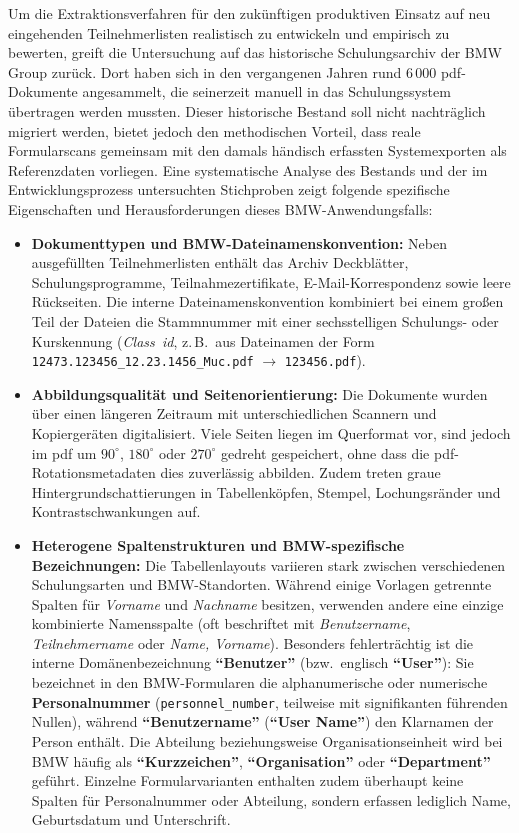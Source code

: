 Um die Extraktionsverfahren für den zukünftigen produktiven Einsatz auf neu eingehenden Teilnehmerlisten realistisch zu entwickeln und empirisch zu bewerten, greift die Untersuchung auf das historische Schulungsarchiv der BMW Group zurück. Dort haben sich in den vergangenen Jahren rund 6\,000 \ac{pdf}-Dokumente angesammelt, die seinerzeit manuell in das Schulungssystem übertragen werden mussten. Dieser historische Bestand soll nicht nachträglich migriert werden, bietet jedoch den methodischen Vorteil, dass reale Formularscans gemeinsam mit den damals händisch erfassten Systemexporten als Referenzdaten vorliegen. Eine systematische Analyse des Bestands und der im Entwicklungsprozess untersuchten Stichproben zeigt folgende spezifische Eigenschaften und Herausforderungen dieses BMW-Anwendungsfalls:
\begin{itemize}
  \item \textbf{Dokumenttypen und BMW-Dateinamenskonvention:} Neben ausgefüllten Teilnehmerlisten enthält das Archiv Deckblätter, Schulungsprogramme, Teilnahmezertifikate, E-Mail-Korrespondenz sowie leere Rückseiten. Die interne Dateinamenskonvention kombiniert bei einem großen Teil der Dateien die Stammnummer mit einer sechsstelligen Schulungs- oder Kurskennung (\emph{Class~\ac{id}}, z.\,B.\ aus Dateinamen der Form \texttt{12473.123456\_12.23.1456\_Muc.pdf} $\rightarrow$ \texttt{123456.pdf}).
  \item \textbf{Abbildungsqualität und Seitenorientierung:} Die Dokumente wurden über einen längeren Zeitraum mit unterschiedlichen Scannern und Kopiergeräten digitalisiert. Viele Seiten liegen im Querformat vor, sind jedoch im \ac{pdf} um $90^\circ$, $180^\circ$ oder $270^\circ$ gedreht gespeichert, ohne dass die \ac{pdf}-Rotationsmetadaten dies zuverlässig abbilden. Zudem treten graue Hintergrundschattierungen in Tabellenköpfen, Stempel, Lochungsränder und Kontrastschwankungen auf.
  \item \textbf{Heterogene Spaltenstrukturen und BMW-spezifische Bezeichnungen:} Die Tabellenlayouts variieren stark zwischen verschiedenen Schulungsarten und BMW-Standorten. Während einige Vorlagen getrennte Spalten für \emph{Vorname} und \emph{Nachname} besitzen, verwenden andere eine einzige kombinierte Namensspalte (oft beschriftet mit \emph{Benutzername}, \emph{Teilnehmername} oder \emph{Name, Vorname}). Besonders fehlerträchtig ist die interne Domänenbezeichnung \textbf{\enquote{Benutzer}} (bzw.\ englisch \textbf{\enquote{User}}): Sie bezeichnet in den BMW-Formularen die alphanumerische oder numerische \textbf{Personalnummer} (\texttt{personnel\_number}, teilweise mit signifikanten führenden Nullen), während \textbf{\enquote{Benutzername}} (\textbf{\enquote{User Name}}) den Klarnamen der Person enthält. Die Abteilung beziehungsweise Organisationseinheit wird bei BMW häufig als \textbf{\enquote{Kurzzeichen}}, \textbf{\enquote{Organisation}} oder \textbf{\enquote{Department}} geführt. Einzelne Formularvarianten enthalten zudem überhaupt keine Spalten für Personalnummer oder Abteilung, sondern erfassen lediglich Name, Geburtsdatum und Unterschrift.

\end{itemize}
